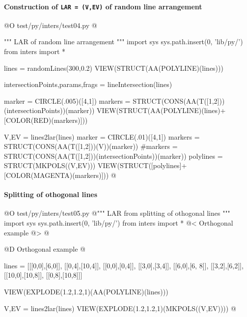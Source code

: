 \documentclass[11pt,oneside]{article}    %
\begin{document}
\paragraph{Construction of \texttt{LAR = (V,EV)} of random line arrangement}
@O test/py/inters/test04.py
@{""" LAR of random line arrangement """
import sys
sys.path.insert(0, 'lib/py/')
from inters import *

lines = randomLines(300,0.2)
VIEW(STRUCT(AA(POLYLINE)(lines)))

intersectionPoints,params,frags = lineIntersection(lines)

marker = CIRCLE(.005)([4,1])
markers = STRUCT(CONS(AA(T([1,2]))(intersectionPoints))(marker))
VIEW(STRUCT(AA(POLYLINE)(lines)+[COLOR(RED)(markers)]))

V,EV = lines2lar(lines)
marker = CIRCLE(.01)([4,1])
markers = STRUCT(CONS(AA(T([1,2]))(V))(marker))
#markers = STRUCT(CONS(AA(T([1,2]))(intersectionPoints))(marker))
polylines = STRUCT(MKPOLS((V,EV)))
VIEW(STRUCT([polylines]+[COLOR(MAGENTA)(markers)]))
@}


\paragraph{Splitting of othogonal lines}
@O test/py/inters/test05.py
@{""" LAR from splitting of othogonal lines """
import sys
sys.path.insert(0, 'lib/py/')
from inters import *
@< Orthogonal example @>
@}

@D Orthogonal example @{
lines = [[[0,0],[6,0]], [[0,4],[10,4]], [[0,0],[0,4]], [[3,0],[3,4]], 
[[6,0],[6, 8]], [[3,2],[6,2]], [[10,0],[10,8]], [[0,8],[10,8]]]

VIEW(EXPLODE(1.2,1.2,1)(AA(POLYLINE)(lines)))

V,EV = lines2lar(lines)
VIEW(EXPLODE(1.2,1.2,1)(MKPOLS((V,EV))))
@}
\end{document}
